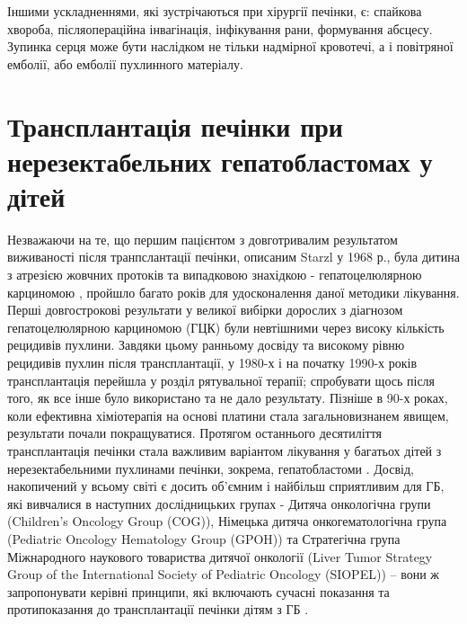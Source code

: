 Іншими ускладненнями, які зустрічаються при хірургії печінки, є: спайкова хвороба, післяопераційна інвагінація, інфікування рани, формування абсцесу. Зупинка серця може бути наслідком не тільки надмірної кровотечі, а і повітряної емболії, або емболії пухлинного матеріалу. 

\section{Трансплантація печінки при нерезектабельних гепатобластомах у дітей}
Незважаючи на те, що першим пацієнтом з довготривалим результатом виживаності після транпслантації печінки, описаним Starzl у 1968 р., була дитина з атрезією жовчних протоків та випадковою знахідкою - гепатоцелюлярною карциномою \cite{pmid24734315}, пройшло багато років для удосконалення даної методики лікування. Перші довгострокові результати у великої вибірки дорослих з діагнозом гепатоцелюлярною карциномою (ГЦК) були невтішними через високу кількість рецидивів пухлини. Завдяки цьому ранньому досвіду та високому рівню рецидивів пухлин після трансплантації, у 1980-х і на початку 1990-х років трансплантація перейшла у розділ рятувальної терапії; спробувати щось після того, як все інше було використано та не дало результату. Пізніше в 90-х роках, коли ефективна хіміотерапія на основі платини стала загальновизнанем явищем, результати почали покращуватися. Протягом останнього десятиліття трансплантація печінки стала важливим варіантом лікування у багатьох дітей з нерезектабельними пухлинами печінки, зокрема, гепатобластоми \cite{pmid20922397}. Досвід, накопичений у всьому світі є досить об’ємним і найбільш сприятливим для ГБ, які вивчалися в  наступних дослідницьких групах - Дитяча онкологічна групи (Children’s Oncology Group (COG)), Німецька дитяча онкогематологічна група (Pediatric Oncology Hematology Group (GPOH)) та Стратегічна група Міжнародного наукового товариства дитячої онкології (Liver Tumor Strategy Group of the International Society of Pediatric Oncology (SIOPEL)) – вони ж запропонувати керівні принципи, які включають сучасні показання та протипоказання до трансплантації печінки дітям з ГБ \cite{pmid20223320}.

